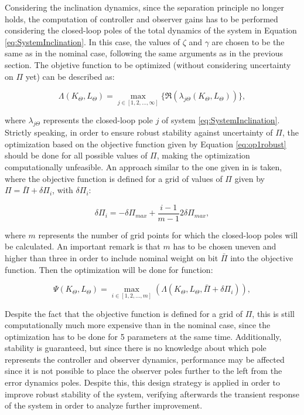 \documentclass[../main.tex]{subfiles}
\begin{document}
Considering the inclination dynamics, since the separation principle no longer holds, the computation of controller and observer gains has to be performed considering the closed-loop poles of the total dynamics of the system in Equation \eqref{eq:SystemInclination}. In this case, the values of $\zeta$ and $\gamma$ are chosen to be the same as in the nominal case, following the same arguments as in the previous section. The objetive function to be optimized (without considering uncertainty on $\Pi$ yet) can be described as:

\begin{equation}
	\varLambda (K_\Theta,L_\Theta) = \max_{j\in[1,2,...,\infty]} \{\Re(\lambda_{j\Theta}(K_{\Theta},L_{\Theta})) \},
	\label{eq:op1robust} 
\end{equation}

where $\lambda_{j\Theta}$ represents the closed-loop pole $j$ of system \eqref{eq:SystemInclination}. Strictly speaking, in order to ensure robust stability against uncertainty of $\Pi$, the optimization based on the objective function given by Equation \eqref{eq:op1robust} should be done for all possible values of $\Pi$, making the optimization computationally unfeasible. An approach similar to the one given in \cite{Kremers2013} is taken, where the objective function is defined for a grid of values of $\Pi$ given by $\Pi = \bar{\Pi} + \delta \Pi_i$, with $\delta \Pi_i$:

\begin{equation}
	\delta \Pi_i = -\delta \Pi_{max} + \frac{i - 1}{m - 1} 2\delta \Pi_{max},
\end{equation} 

where $m$ represents the number of grid points for which the closed-loop poles will be calculated. An important remark is that $m$ has to be chosen uneven and higher than three in order to include nominal weight on bit $\bar{\Pi}$ into the objective function. Then the optimization will be done for function:

\begin{equation}
	\Psi(K_\Theta,L_\Theta) = \max_{i\in [1,2,...,m]} (\varLambda (K_\Theta, L_\Theta, \bar{\Pi} + \delta \Pi_i)), \label{eq:ObjectiveRobust}
\end{equation}

Despite the fact that the objective function is defined for a grid of $\Pi$, this is still computationally much more expensive than in the nominal case, since the optimization has to be done for 5 parameters at the same time. Additionally, stability is guaranteed, but since there is no knowledge about which pole represents the controller and observer dynamics, performance may be affected since it is not possible to place the observer poles further to the left from the error dynamics poles. Despite this, this design strategy is applied in order to improve robust stability of the system, verifying afterwards the transient response of the system in order to analyze further improvement.
\end{document}
